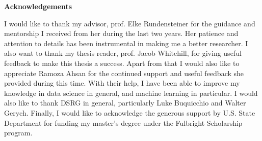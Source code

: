 \begin{center}
\textbf{Acknowledgements}
\end{center}
I would like to thank my advisor, prof. Elke Rundensteiner for the guidance and mentorship I received from her during the last two years. Her patience and attention to details has been instrumental in making me a better researcher. I also want to thank my thesis reader, prof. Jacob Whitehill, for giving useful feedback to make this thesis a success. Apart from that I would also like to appreciate Ramoza Ahsan for the continued support and useful feedback she provided during this time. With their help, I have been able to improve my knowledge in data science in general, and machine learning in particular. I would also like to thank DSRG in general, particularly Luke Buquicchio and Walter Gerych.  Finally, I would like to acknowledge the generous support by U.S. State Department for funding my master's degree under the Fulbright Scholarship program.  


\newpage
    
    